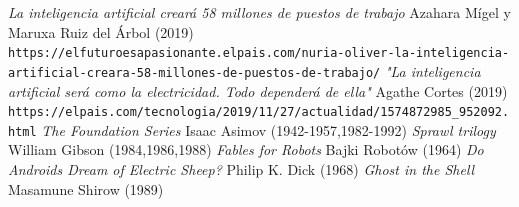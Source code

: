 \documentclass[12pt,a4paper]{article}
\begin{document}
\begin{thebibliography}{9}
 \textit{La inteligencia artificial creará 58 millones de puestos de trabajo} Azahara Mígel y Maruxa Ruiz del Árbol (2019)
\\\texttt{https://elfuturoesapasionante.elpais.com/nuria-oliver-la-inteligencia-}
\\\texttt{artificial-creara-58-millones-de-puestos-de-trabajo/}
 \textit{"La inteligencia artificial será como la electricidad. Todo dependerá de ella"} Agathe Cortes (2019)
\\\texttt{https://elpais.com/tecnologia/2019/11/27/actualidad/1574872985\_952092.html}
 \textit{The Foundation Series} Isaac Asimov (1942-1957,1982-1992)
 \textit{Sprawl trilogy} William Gibson (1984,1986,1988)
 \textit{Fables for Robots} Bajki Robotów (1964)
 \textit{Do Androids Dream of Electric Sheep?} Philip K. Dick (1968)
 \textit{Ghost in the Shell} Masamune Shirow (1989)
\end{thebibliography}
\end{document}
